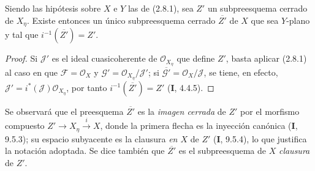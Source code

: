 \begin{proposition}[2.8.5]
\label{IV.2.8.5-fr}
Siendo las hipótesis sobre $X$ e $Y$ las de \textup{(2.8.1)}, sea $Z'$ un
subpreesquema cerrado de $X_\eta$. Existe entonces un único subpreesquema
cerrado $\overline{Z'}$ de $X$ que sea $Y$-\textup{plano} y tal que
$i^{-1}(\overline{Z'})=Z'$.
\end{proposition}

\begin{proof}
Si $\mathcal J'$ es el ideal cuasicoherente de $\mathcal O_{X_\eta}$
que define $Z'$, basta aplicar (2.8.1) al caso en que
$\mathcal F=\mathcal O_X$ y
$\mathcal G'=\mathcal O_{X_\eta}/\mathcal J'$; si
$\overline{\mathcal G'}=\mathcal O_X/\mathcal J$, se tiene, en efecto,
$\mathcal J'=i^*(\mathcal J)\mathcal O_{X_\eta}$, por tanto
$i^{-1}(\overline{Z'})=Z'$ (\textbf I, 4.4.5).
\end{proof}

Se observará que el preesquema $\overline{Z'}$ es la \emph{imagen cerrada} de $Z'$
por el morfismo compuesto
$Z'\longrightarrow X_\eta\xrightarrow{i}X$,
donde la primera flecha es la inyección canónica (\textbf I, 9.5.3); su espacio
subyacente es la clausura \emph{en $X$} de $Z'$ (\textbf I, 9.5.4), lo que
justifica la notación adoptada. Se dice también que $\overline{Z'}$ es el
subpreesquema de $X$ \emph{clausura} de $Z'$.
